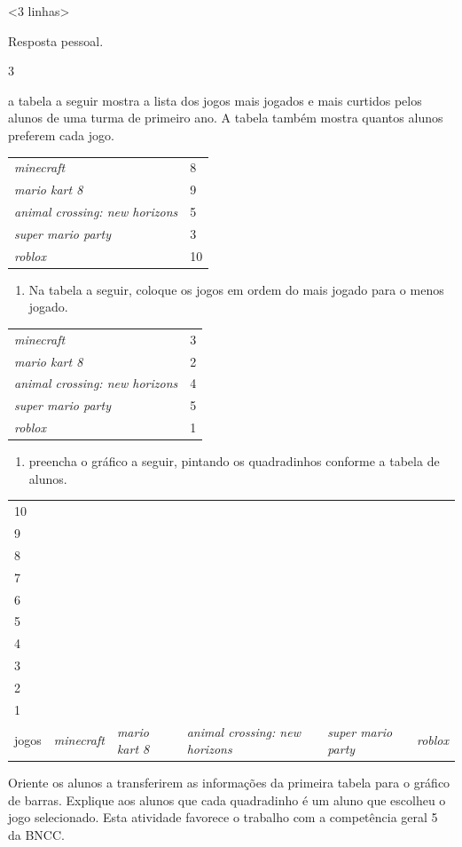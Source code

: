 \textless{}3 linhas\textgreater{}

Resposta pessoal.

\num{3}

a tabela a seguir mostra a lista dos jogos mais jogados e mais curtidos pelos
alunos de uma turma de primeiro ano. A tabela também mostra quantos alunos preferem cada
jogo.

\begin{longtable}[]{@{}ll@{}}
\toprule
\emph{minecraft} & 8\tabularnewline
\emph{mario kart 8} & 9\tabularnewline
\emph{animal crossing: new horizons} & 5\tabularnewline
\emph{super mario party} & 3\tabularnewline
\emph{roblox} & 10\tabularnewline
\bottomrule
\end{longtable}

\begin{enumerate}
\def\labelenumi{\Alph{enumi})}
\item
  Na tabela a seguir, coloque os jogos em ordem do
  mais jogado para o menos jogado.
\end{enumerate}

\begin{longtable}[]{@{}ll@{}}
\toprule
\emph{minecraft} & 3\tabularnewline
\emph{mario kart 8} & 2\tabularnewline
\emph{animal crossing: new horizons} & 4\tabularnewline
\emph{super mario party} & 5\tabularnewline
\emph{roblox} & 1\tabularnewline
\bottomrule
\end{longtable}


\begin{enumerate}
\def\labelenumi{\Alph{enumi})}
\item
  preencha o gráfico a seguir, pintando os quadradinhos conforme a tabela
  de alunos.
\end{enumerate}

\begin{longtable}[]{@{}llllll@{}}
\toprule
10 & & & & &\tabularnewline
9 & & & & &\tabularnewline
8 & & & & &\tabularnewline
7 & & & & &\tabularnewline
6 & & & & &\tabularnewline
5 & & & & &\tabularnewline
4 & & & & &\tabularnewline
3 & & & & &\tabularnewline
2 & & & & &\tabularnewline
1 & & & & &\tabularnewline
jogos & \emph{minecraft} & \emph{mario kart 8} & \emph{animal crossing:
new horizons} & \emph{super mario party} & \emph{roblox}\tabularnewline
\bottomrule
\end{longtable}

Oriente os alunos a transferirem as informações da
primeira tabela para o gráfico de barras. Explique aos alunos que cada
quadradinho é um aluno que escolheu o jogo selecionado. Esta atividade
favorece o trabalho com a competência geral 5 da BNCC.

